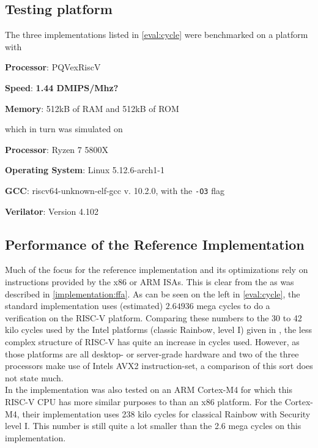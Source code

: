 \subsection{Testing platform}
The three implementations listed in \cref{eval:cycle} were benchmarked on a platform with
\begin{description}
    \item \textbf{Processor}: PQVexRiscV
    \item \textbf{Speed}: \textbf{1.44 DMIPS/Mhz?}
    \item \textbf{Memory}: 512kB of RAM and 512kB of ROM
\end{description}
which in turn was simulated on
\begin{description}
    \item \textbf{Processor}: Ryzen 7 5800X
    \item \textbf{Operating System}: Linux 5.12.6-arch1-1
    \item \textbf{GCC}: riscv64-unknown-elf-gcc v. 10.2.0, with the \texttt{-O3} flag
    \item \textbf{Verilator}: Version 4.102
\end{description}
\subsection{Performance of the Reference Implementation}
Much of the focus for the reference implementation and its optimizations rely on instructions provided by the x86 or ARM ISAs. This is clear from the \cite{rainbownist} as was described in \cref{implementation:ffa}. As can be seen on the left in \cref{eval:cycle}, the standard implementation uses (estimated) $2.64936$ mega cycles to do a verification on the RISC-V platform. Comparing these numbers to the 30 to 42 kilo cycles used by the Intel platforms (classic Rainbow, level I) given in \cite{rainbownist}, the less complex structure of RISC-V has quite an increase in cycles used. However, as those platforms are all desktop- or server-grade hardware and two of the three processors make use of Intels AVX2 instruction-set, a comparison of this sort does not state much.
\medskip\\
In \cite{rainbownist} the implementation was also tested on an ARM Cortex-M4 for which this RISC-V CPU has more similar purposes to than an x86 platform. For the Cortex-M4, their implementation uses 238 kilo cycles for classical Rainbow with Security level I. This number is still quite a lot smaller than the 2.6 mega cycles on this implementation.

